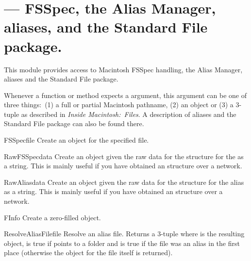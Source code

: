 \section{ ---
         FSSpec, the Alias Manager,  aliases,
         and the Standard File package.}




This module provides access to Macintosh FSSpec handling, the Alias
Manager,  aliases and the Standard File package.

Whenever a function or method expects a  argument, this
argument can be one of three things:\ (1) a full or partial Macintosh
pathname, (2) an  object or (3) a 3-tuple  as described in \emph{Inside
Macintosh:\ Files}\@. A description of aliases and the Standard File
package can also be found there.

\begin{funcdesc}{FSSpec}{file}
Create an  object for the specified file.
\end{funcdesc}

\begin{funcdesc}{RawFSSpec}{data}
Create an  object given the raw data for the \C{}
structure for the  as a string.  This is mainly useful
if you have obtained an  structure over a network.
\end{funcdesc}

\begin{funcdesc}{RawAlias}{data}
Create an  object given the raw data for the \C{}
structure for the alias as a string.  This is mainly useful if you
have obtained an  structure over a network.
\end{funcdesc}

\begin{funcdesc}{FInfo}{}
Create a zero-filled  object.
\end{funcdesc}

\begin{funcdesc}{ResolveAliasFile}{file}
Resolve an alias file. Returns a 3-tuple  where  is the resulting
 object,  is true if  points
to a folder and  is true if the file was an alias in the
first place (otherwise the  object for the file itself
is returned).
\end{funcdesc}

